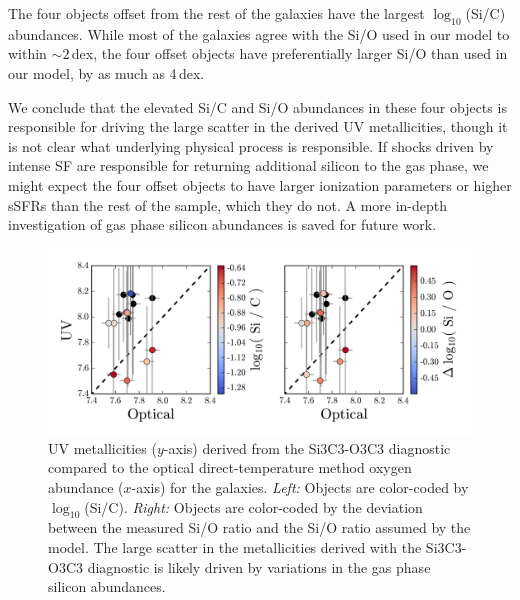 \documentclass[preprint2]{aastex62}
\begin{document}
The four objects offset from the rest of the \citet{Berg+2016} galaxies have the largest $\log_{10}$(Si/C) abundances. While most of the \citet{Berg+2016} galaxies agree with the Si/O used in our model to within $\sim2$\,dex, the four offset objects have preferentially larger Si/O than used in our model, by as much as 4\,dex.

We conclude that the elevated Si/C and Si/O abundances in these four objects is responsible for driving the large scatter in the derived UV metallicities, though it is not clear what underlying physical process is responsible. If shocks driven by intense SF are responsible for returning additional silicon to the gas phase, we might expect the four offset objects to have larger ionization parameters or higher sSFRs than the rest of the \citet{Berg+2016} sample, which they do not. A more in-depth investigation of gas phase silicon abundances is saved for future work.

\begin{figure}
  \begin{center}
    \includegraphics[width=\linewidth]{figs/f9_new.png}
    \caption{UV metallicities ($y$-axis) derived from the Si3C3-O3C3 diagnostic compared to the optical direct-temperature method oxygen abundance ($x$-axis) for the \citet{Berg+2016} galaxies. \emph{Left:} Objects are color-coded by $\log_{10}$(Si/C). \emph{Right:} Objects are color-coded by the deviation between the measured Si/O ratio and the Si/O ratio assumed by the \citet{Byler+2018} model. The large scatter in the metallicities derived with the Si3C3-O3C3 diagnostic is likely driven by variations in the gas phase silicon abundances.}
    \label{fig:SiC}
  \end{center}
\end{figure}
\end{document}
